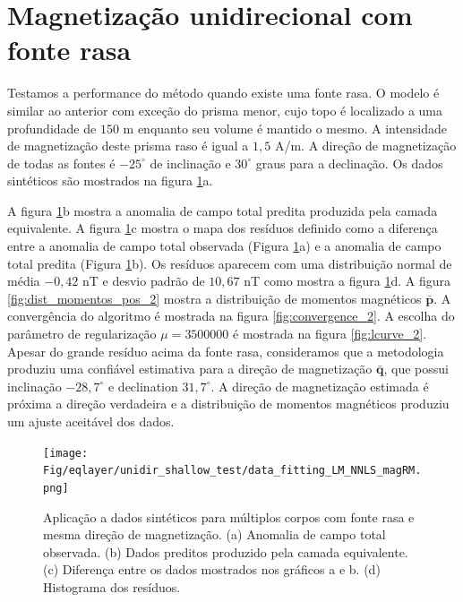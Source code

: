 \section{Magnetização unidirecional com fonte rasa}

Testamos a performance do método quando existe uma fonte rasa. O modelo é similar ao anterior com exceção do prisma menor, cujo topo é localizado a uma profundidade de $150$ m enquanto seu volume é mantido o mesmo. A intensidade de magnetização deste prisma raso é igual a $1,5$ A/m. A direção de magnetização de todas as fontes é $-25^\circ$ de inclinação e $30^\circ$ graus para a declinação. Os dados sintéticos são mostrados na figura \ref{fig:data_fitting_2}a.

A figura \ref{fig:data_fitting_2}b mostra a anomalia de campo total predita produzida pela camada equivalente. A figura \ref{fig:data_fitting_2}c mostra o mapa dos resíduos definido como a diferença entre a anomalia de campo total observada (Figura \ref{fig:data_fitting_2}a) e a anomalia de campo total predita (Figura \ref{fig:data_fitting_2}b). Os resíduos aparecem com uma distribuição normal de média $-0,42$ nT e desvio padrão de $10,67$ nT como mostra a figura \ref{fig:data_fitting_2}d. A figura \ref{fig:dist_momentos_pos_2} mostra a distribuição de momentos magnéticos $\bar{\mathbf{p}}$. A convergência do algoritmo é mostrada na figura \ref{fig:convergence_2}. A escolha do parâmetro de regularização $\mu = 3500000$ é mostrada na figura \ref{fig:lcurve_2}. Apesar do grande resíduo acima da fonte rasa, consideramos que a metodologia produziu uma confiável estimativa para a direção de magnetização $\bar{\mathbf{q}}$, que possui inclinação $-28,7^\circ$ e declination $31,7^\circ$. A direção de magnetização estimada é próxima a direção verdadeira e a distribuição de momentos magnéticos produziu um ajuste aceitável dos dados. 

\begin{figure}
	\centering
	\texttt{[image: Fig/eqlayer/unidir\_shallow\_test/data\_fitting\_LM\_NNLS\_magRM.png]}
	\caption{Aplicação a dados sintéticos para múltiplos corpos com fonte rasa e mesma direção de magnetização. (a) Anomalia de campo total observada. (b) Dados preditos produzido pela camada equivalente. (c) Diferença entre os dados mostrados nos gráficos a e b. (d) Histograma dos resíduos.}
	\label{fig:data_fitting_2}
\end{figure}

